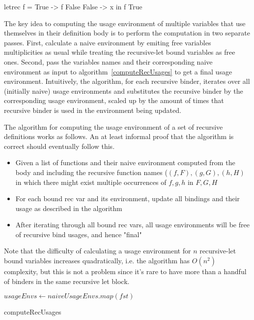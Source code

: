 \documentclass[a4paper, draft]{report}
\begin{document}
\begin{code}
letrec f = \case
        True -> f False
        False -> x
in f True
\end{code}

The key idea to computing the usage environment of multiple variables that use
themselves in their definition body is to perform the computation in two separate passes. First,
calculate a naive environment by emiting free variables multiplicities as usual
while treating the recursive-let bound variables as free ones. Second, pass the
variables names and their corresponding naive environment as input to
algorithm~\ref{computeRecUsages} to get a final usage environment. Intuitively,
the algorithm, for each recursive binder, iterates over all (initially naive) usage
environments and substitutes the recursive binder by the corresponding usage
environment, scaled up by the amount of times that recursive binder is used in
the environment being updated.

The algorithm for computing the usage environment of a set of
recursive definitions works as follows. An at least informal proof
that the algorithm is correct should eventually follow this.

\begin{itemize}
    \item Given a list of functions and their naive environment computed from
        the body and including the recursive function names ($(f, F), (g, G),
        (h, H)$ in which there might exist multiple occurrences of $f, g, h$ in $F, G, H$
    \item For each bound rec var and its environment, update all bindings and
        their usage as described in the algorithm
    \item After iterating through all bound rec vars, all usage environments
        will be free of recursive bind usages, and hence "final"
\end{itemize}

Note that the difficulty of calculating a usage environment for $n$
recursive-let bound variables increases quadratically, i.e. the algorithm has
$O(n^2)$ complexity, but this is not a problem since it's rare to have more than
a handful of binders in the same recursive let block.

\begin{algorithm}
$usageEnvs \gets naiveUsageEnvs.map(fst)$\;
\caption{computeRecUsages\label{computeRecUsages}}
\end{algorithm}
\end{document}
